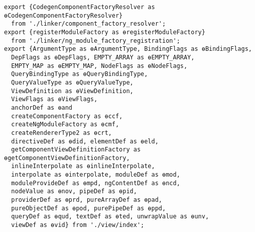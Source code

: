 \begin{verbatim}
export {CodegenComponentFactoryResolver as ɵCodegenComponentFactoryResolver}
  from './linker/component_factory_resolver';
export {registerModuleFactory as ɵregisterModuleFactory}
  from './linker/ng_module_factory_registration';
export {ArgumentType as ɵArgumentType, BindingFlags as ɵBindingFlags,
  DepFlags as ɵDepFlags, EMPTY_ARRAY as ɵEMPTY_ARRAY,
  EMPTY_MAP as ɵEMPTY_MAP, NodeFlags as ɵNodeFlags,
  QueryBindingType as ɵQueryBindingType,
  QueryValueType as ɵQueryValueType,
  ViewDefinition as ɵViewDefinition,
  ViewFlags as ɵViewFlags,
  anchorDef as ɵand
  createComponentFactory as ɵccf,
  createNgModuleFactory as ɵcmf,
  createRendererType2 as ɵcrt,
  directiveDef as ɵdid, elementDef as ɵeld,
  getComponentViewDefinitionFactory as ɵgetComponentViewDefinitionFactory,
  inlineInterpolate as ɵinlineInterpolate,
  interpolate as ɵinterpolate, moduleDef as ɵmod,
  moduleProvideDef as ɵmpd, ngContentDef as ɵncd,
  nodeValue as ɵnov, pipeDef as ɵpid,
  providerDef as ɵprd, pureArrayDef as ɵpad,
  pureObjectDef as ɵpod, purePipeDef as ɵppd,
  queryDef as ɵqud, textDef as ɵted, unwrapValue as ɵunv,
  viewDef as ɵvid} from './view/index';
\end{verbatim}
